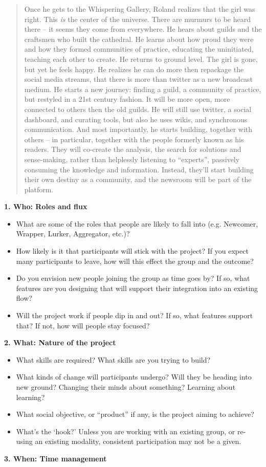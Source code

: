 \begin{quote}
Once he gets to the Whispering Gallery, Roland realizes that the girl
was right. This \emph{is} the center of the universe. There are murmurs
to be heard there -- it seems they come from everywhere. He hears about
guilds and the craftsmen who built the cathedral. He learns about how
proud they were and how they formed communities of practice, educating
the uninitiated, teaching each other to create. He returns to ground
level. The girl is gone, but yet he feels happy. He realizes he can do
more then repackage the social media streams, that there is more than
twitter as a new broadcast medium. He starts a new journey: finding a
guild, a community of practice, but restyled in a 21st century fashion.
It will be more open, more connected to others then the old guilds. He
will still use twitter, a social dashboard, and curating tools, but also
he uses wikis, and synchronous communication. And most importantly, he
starts building, together with others -- in particular, together with
the people formerly known as his readers. They will co-create the
analysis, the search for solutions and sense-making, rather than
helplessly listening to ``experts'', passively consuming the knowledge
and information. Instead, they'll start building their own destiny as a
community, and the newsroom will be part of the platform.
\end{quote}
\textbf{1. Who: Roles and flux}

\begin{itemize}
\item
  What are some of the roles that people are likely to fall into (e.g.
  Newcomer, Wrapper, Lurker, Aggregator, etc.)?
\item
  How likely is it that participants will stick with the project? If you
  expect many participants to leave, how will this effect the group and
  the outcome?
\item
  Do you envision new people joining the group as time goes by? If so,
  what features are you designing that will support their integration
  into an existing flow?
\item
  Will the project work if people dip in and out? If so, what features
  support that? If not, how will people stay focused?
\end{itemize}
\textbf{2. What: Nature of the project}

\begin{itemize}
\item
  What skills are required? What skills are you trying to build?
\item
  What kinds of change will participants undergo? Will they be heading
  into new ground? Changing their minds about something? Learning about
  learning?
\item
  What social objective, or ``product'' if any, is the project aiming to
  achieve?
\item
  What's the `hook?' Unless you are working with an existing group, or
  re-using an existing modality, consistent participation may not be a
  given.
\end{itemize}
\textbf{3. When: Time management}

